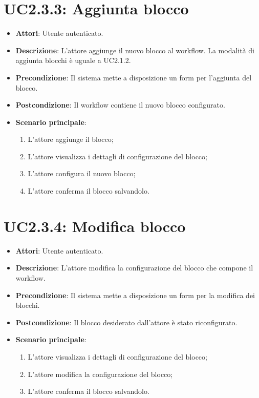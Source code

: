 \section{UC2.3.3: Aggiunta blocco}
\label{UC2.3.3}
\begin{itemize}
	\item \textbf{Attori}: Utente autenticato.
	\item \textbf{Descrizione}: L'attore aggiunge il nuovo blocco al workflow. La modalità di aggiunta blocchi è uguale a UC2.1.2.
	\item \textbf{Precondizione}: Il sistema mette a disposizione un form per l'aggiunta del blocco.
	\item \textbf{Postcondizione}: Il workflow contiene il nuovo blocco configurato.
	\item \textbf{Scenario principale}:
	\begin{enumerate} \item L'attore aggiunge il blocco; \item L'attore visualizza i dettagli di configurazione del blocco; \item L'attore configura il nuovo blocco; \item L'attore conferma il blocco salvandolo. \end{enumerate}
\end{itemize}

\section{UC2.3.4: Modifica blocco}
\label{UC2.3.4}
\begin{itemize}
	\item \textbf{Attori}: Utente autenticato.
	\item \textbf{Descrizione}: L'attore modifica la configurazione del blocco che compone il workflow.
	\item \textbf{Precondizione}: Il sistema mette a disposizione un form per la modifica dei blocchi.
	\item \textbf{Postcondizione}: Il blocco desiderato dall'attore è stato riconfigurato.
	\item \textbf{Scenario principale}:
	\begin{enumerate} \item L'attore visualizza i dettagli di configurazione del blocco; \item L'attore modifica la configurazione del blocco; \item L'attore conferma il blocco salvandolo.\end{enumerate}
\end{itemize}

